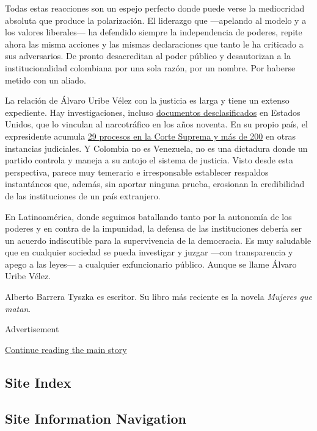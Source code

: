 Todas estas reacciones son un espejo perfecto donde puede verse la
mediocridad absoluta que produce la polarización. El liderazgo que
---apelando al modelo y a los valores liberales--- ha defendido siempre
la independencia de poderes, repite ahora las misma acciones y las
mismas declaraciones que tanto le ha criticado a sus adversarios. De
pronto desacreditan al poder público y desautorizan a la
institucionalidad colombiana por una sola razón, por un nombre. Por
haberse metido con un aliado.

La relación de Álvaro Uribe Vélez con la justicia es larga y tiene un
extenso expediente. Hay investigaciones, incluso
\href{https://www.nytimes3xbfgragh.onion/es/2018/05/25/espanol/cables-uribe-narcotrafico-colombia.html}{documentos
desclasificados} en Estados Unidos, que lo vinculan al narcotráfico en
los años noventa. En su propio país, el expresidente acumula
\href{https://www.semana.com/nacion/articulo/alvaro-uribe-polemicas-e-investigaciones/691756}{29
procesos en la Corte Suprema y más de 200} en otras instancias
judiciales. Y Colombia no es Venezuela, no es una dictadura donde un
partido controla y maneja a su antojo el sistema de justicia. Visto
desde esta perspectiva, parece muy temerario e irresponsable establecer
respaldos instantáneos que, además, sin aportar ninguna prueba,
erosionan la credibilidad de las instituciones de un país extranjero.

En Latinoamérica, donde seguimos batallando tanto por la autonomía de
los poderes y en contra de la impunidad, la defensa de las instituciones
debería ser un acuerdo indiscutible para la supervivencia de la
democracia. Es muy saludable que en cualquier sociedad se pueda
investigar y juzgar ---con transparencia y apego a las leyes--- a
cualquier exfuncionario público. Aunque se llame Álvaro Uribe Vélez.

Alberto Barrera Tyszka es escritor. Su libro más reciente es la novela
\emph{Mujeres que matan}.

Advertisement

\protect\hyperlink{after-bottom}{Continue reading the main story}

\hypertarget{site-index}{%
\subsection{Site Index}\label{site-index}}

\hypertarget{site-information-navigation}{%
\subsection{Site Information
Navigation}\label{site-information-navigation}}

